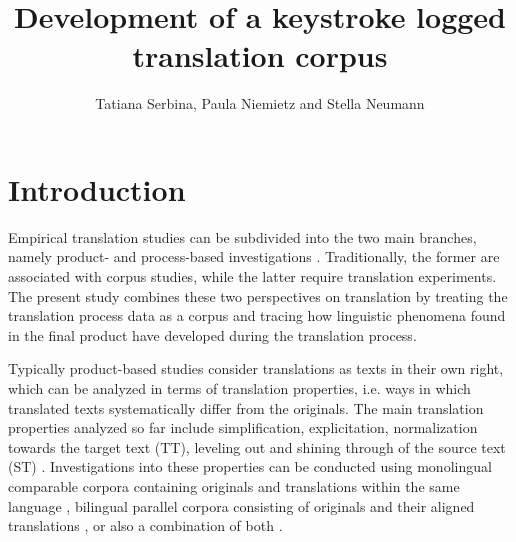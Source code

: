 \documentclass[output=paper]{LSP/langsci}
\author{Tatiana Serbina, Paula Niemietz and Stella Neumann}
\title{Development of a keystroke logged translation corpus}
\begin{document}
 
\section{Introduction}
Empirical translation studies can be subdivided into the two main branches, namely product- and process-based investigations \citep[see][]{Laviosa2002,Göpferich2008}. Traditionally, the former are associated with corpus studies, while the latter require translation experiments. The present study combines these two perspectives on translation by treating the translation process data as a corpus and tracing how linguistic phenomena found in the final product have developed during the translation process.

Typically product-based studies consider translations as texts in their own right, which can be analyzed in terms of translation properties, i.e. ways in which translated texts systematically differ from the originals. The main translation properties analyzed so far include simplification, explicitation, normalization towards the target text (TT), leveling out \citep{Baker1996} and shining through of the source text (ST) \citep{Teich2003}. Investigations into these properties can be conducted using monolingual comparable corpora containing originals and translations within the same language \citep[e.g.][]{Laviosa2002}, bilingual parallel corpora consisting of originals and their aligned translations \citep[e.g][]{Becher2010}, or also a combination of both \citep{Culo2012,Hansen-Schirra2012}.
\end{document}
